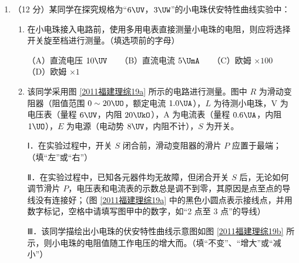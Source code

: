 \documentclass[\gkver]{gaokaozhenti}
\begin{document}
\begin{enumerate}
\begin{enumerate}
\begin{enumerate}
		（A）把单摆从平衡位置拉开 $30^\circ$ 的摆角，并在释放摆球的同时开始计时

		（B）测量摆球通过最低点 100 次的时间 $t$，则单摆周期为 $\frac{t}{100}$

		（C）用悬线的长度加摆球的直径作为摆长，代入单摆周期公式计算得到的重力加速度值偏大

		（D）选择密度较小的摆球，测得的重力加速度值误差较小
	\end{enumerate}


	\item
	（12 分）某同学在探究规格为“$6\UV$，$3\UW$”的小电珠伏安特性曲线实验中：
	\begin{enumerate}
		\item
		在小电珠接入电路前，使用多用电表直接测量小电珠的电阻，则应将选择开关旋至档进行测量。（填选项前的字母）

		（A）直流电压 $10\UV$　　（B）直流电流 $5\UmA$　　（C）欧姆 $\times100$　　（D）欧姆 $\times1$
		\item
		该同学采用图 \ref{2011福建理综19a} 所示的电路进行测量。图中 $R$ 为滑动变阻器（阻值范围 $0\sim20\UO$，额定电流 $1.0\UA$），$L$ 为待测小电珠，V 为电压表（量程 $6\UV$，内阻 $20\UkO$），A 为电流表（量程 $0.6\UA$，内阻 $1\UO$），$E$ 为电源（电动势 $8\UV$，内阻不计），$S$ 为开关。

		Ⅰ．在实验过程中，开关 $S$ 闭合前，滑动变阻器的滑片 $P$ 应置于最端；（填“左”或“右”）

		Ⅱ．在实验过程中，已知各元器件均无故障，但闭合开关 $S$ 后，无论如何调节滑片 $P$，电压表和电流表的示数总是调不到零，其原因是点至点的导线没有连接好；（图 \ref{2011福建理综19a} 中的黑色小圆点表示接线点，并用数字标记，空格中请填写图甲中的数字，如“2 点至 3 点”的导线）

		Ⅲ．该同学描绘出小电珠的伏安特性曲线示意图如图 \ref{2011福建理综19b} 所示，则小电珠的电阻值随工作电压的增大而。（填“不变”、“增大”或“减小”）
	\end{enumerate}

\end{enumerate}
\end{enumerate}
\end{document}
